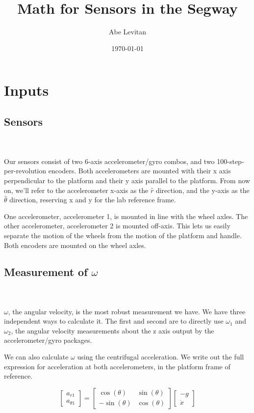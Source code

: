 \documentclass[11pt]{amsart}
\title{Math for Sensors in the Segway}
\author{Abe Levitan}
\date{\today}                                           %
\begin{document}
\lstset{language=Python}
\maketitle

\section{Inputs}

\subsection{Sensors}
\ \\ \ \\
Our sensors consist of two 6-axis accelerometer/gyro combos, and two 100-step-per-revolution encoders. Both accelerometers are mounted with their x axis perpendicular to the platform and their y axis parallel to the platform. From now on, we'll refer to the accelerometer x-axis as the $\hat{r}$ direction, and the y-axis as the $\hat{\theta}$ direction, reserving x and y for the lab reference frame.

One accelerometer, accelerometer 1, is mounted in line with the wheel axles. The other accelerometer, accelerometer 2 is mounted off-axis. This lets us easily separate the motion of the wheels from the motion of the platform and handle. Both encoders are mounted on the wheel axles.

\subsection{Measurement of $\omega$} 
\ \\ \ \\
$\omega$, the angular velocity, is the most robust measurement we have. We have three independent ways to calculate it. The first and second are to directly use $\omega_1$ and $\omega_2$, the angular velocity measurements about the z axis output by the accelerometer/gyro packages.

We can also calculate $\omega$ using the centrifugal acceleration. We write out the full expression for acceleration at both accelerometers, in the platform frame of reference.

\begin{equation}
\begin{bmatrix}
a_{r1} \\ a_{\theta1}
\end{bmatrix} = \begin{bmatrix}
\cos(\theta) & \sin(\theta) \\ -\sin(\theta) & \cos(\theta)
\end{bmatrix} \begin{bmatrix}
-g \\ \ddot{x}
\end{bmatrix}
\end{equation}
\end{document}
